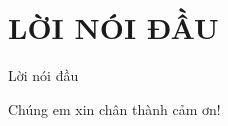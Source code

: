 \section*{LỜI NÓI ĐẦU} %
\thispagestyle{empty}

Lời nói đầu

Chúng em xin chân thành cảm ơn!



\cleardoublepage
